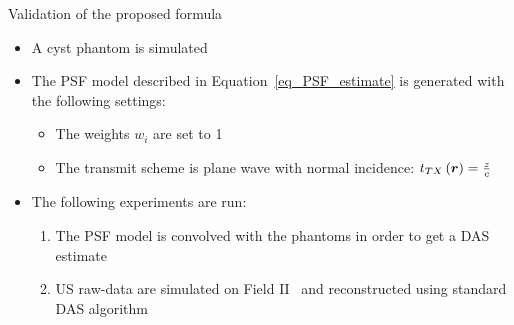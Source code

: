 {\begin{block}{Validation of the proposed formula}
	\begin{itemize}
		\item A cyst phantom is simulated
		\item The PSF model described in Equation~\eqref{eq_PSF_estimate} is generated with the following settings:
		\begin{itemize}
			\item The weights $w_i$ are set to 1
			\item The transmit scheme is plane wave with normal incidence: $t_{TX} \left(\bm{r}\right) = \frac{z}{c}$
		\end{itemize}
		\item The following experiments are run:
		\begin{enumerate}
			\item The PSF model is convolved with the phantoms in order to get a DAS estimate
			\item US raw-data are simulated on Field II~\cite{jensen1992} and reconstructed using standard DAS algorithm
		\end{enumerate}
	\end{itemize}
	\newlength{\CIRSFigWidth} \setlength{\CIRSFigWidth}{0.4\textwidth}
	\newlength{\CIRSFigHeight}

\end{block}}
